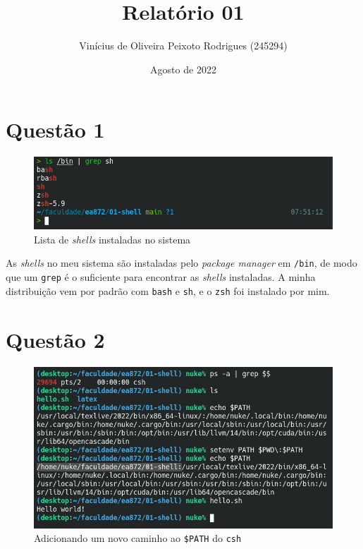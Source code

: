 \documentclass{article}
\title{Relatório 01}
\author{Vinícius de Oliveira Peixoto Rodrigues (245294)}
\date{Agosto de 2022}
\begin{document}
\maketitle

\section*{Questão 1}

\begin{figure}[!ht]
    \begin{center}
        \includegraphics[width=\textwidth]{images/q1.png}
        \caption{Lista de \textit{shells} instaladas no sistema}
    \end{center}
\end{figure}

As \textit{shells} no meu sistema são instaladas pelo \textit{package manager} em \texttt{/bin}, de modo que um \texttt{grep} é o suficiente para encontrar as \textit{shells} instaladas. A minha distribuição vem por padrão com \texttt{bash} e \texttt{sh}, e o \texttt{zsh} foi instalado por mim.

\FloatBarrier


\newpage
\section*{Questão 2}

\begin{figure}[!ht]
    \begin{center}
        \includegraphics[width=\textwidth]{images/q2.png}
        \caption{Adicionando um novo caminho ao \texttt{\$PATH} do \texttt{csh}}
        \label{fig:q2}
    \end{center}
\end{figure}
\end{document}
